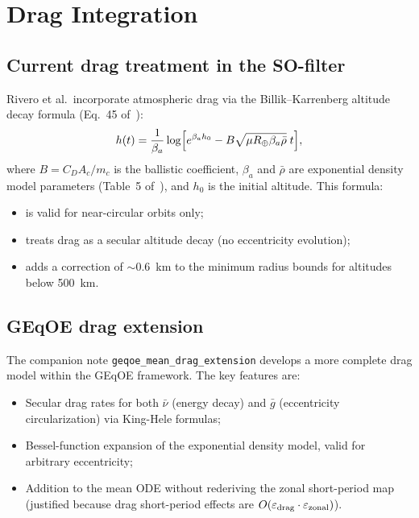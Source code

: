 \documentclass[11pt]{article}
\newcommand{\eps}{\varepsilon}
\begin{document}
\section{Drag Integration}
\label{sec:drag}

\subsection{Current drag treatment in the SO-filter}

Rivero et al.\ incorporate atmospheric drag via the Billik--Karrenberg
altitude decay formula (Eq.~45 of~\cite{rivero2025}):
\begin{equation}
h(t) = \frac{1}{\beta_a}\log\Bigl[e^{\beta_a h_0}
- B\sqrt{\mu R_\oplus \beta_a \bar\rho}\; t\Bigr],
\label{eq:billik}
\end{equation}
where $B = C_D A_c / m_c$ is the ballistic coefficient, $\beta_a$ and
$\bar\rho$ are exponential density model parameters (Table~5
of~\cite{rivero2025}), and $h_0$ is the initial altitude. This formula:
\begin{itemize}
\item is valid for near-circular orbits only;
\item treats drag as a secular altitude decay (no eccentricity evolution);
\item adds a correction of $\sim\!0.6$~km to the minimum radius bounds for
altitudes below 500~km.
\end{itemize}

\subsection{GEqOE drag extension}

The companion note \texttt{geqoe\_mean\_drag\_extension} develops a more
complete drag model within the GEqOE framework. The key features are:
\begin{itemize}
\item Secular drag rates for both $\bar\nu$ (energy decay) and $\bar g$
(eccentricity circularization) via King-Hele formulas;
\item Bessel-function expansion of the exponential density model, valid for
arbitrary eccentricity;
\item Addition to the mean ODE without rederiving the zonal short-period map
(justified because drag short-period effects are $O(\eps_{\rm drag}
\cdot \eps_{\rm zonal})$).
\end{itemize}
\end{document}
